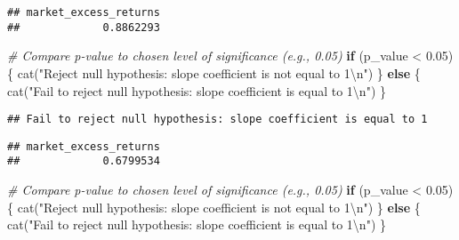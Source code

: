 \documentclass[
]{article}
\newenvironment{Shaded}{\begin{snugshade}}{\end{snugshade}}
\newcommand{\CommentTok}[1]{\textcolor[rgb]{0.56,0.35,0.01}{\textit{#1}}}
\newcommand{\ControlFlowTok}[1]{\textcolor[rgb]{0.13,0.29,0.53}{\textbf{#1}}}
\newcommand{\DecValTok}[1]{\textcolor[rgb]{0.00,0.00,0.81}{#1}}
\newcommand{\FloatTok}[1]{\textcolor[rgb]{0.00,0.00,0.81}{#1}}
\newcommand{\FunctionTok}[1]{\textcolor[rgb]{0.00,0.00,0.00}{#1}}
\newcommand{\NormalTok}[1]{#1}
\newcommand{\OtherTok}[1]{\textcolor[rgb]{0.56,0.35,0.01}{#1}}
\newcommand{\SpecialCharTok}[1]{\textcolor[rgb]{0.00,0.00,0.00}{#1}}
\newcommand{\StringTok}[1]{\textcolor[rgb]{0.31,0.60,0.02}{#1}}
\begin{document}
\begin{verbatim}
## market_excess_returns 
##             0.8862293
\end{verbatim}

\begin{Shaded}
\begin{Highlighting}[]
\CommentTok{\# Compare p{-}value to chosen level of significance (e.g., 0.05)}
\ControlFlowTok{if}\NormalTok{ (p\_value }\SpecialCharTok{\textless{}} \FloatTok{0.05}\NormalTok{) \{}
  \FunctionTok{cat}\NormalTok{(}\StringTok{"Reject null hypothesis: slope coefficient is not equal to 1}\SpecialCharTok{\textbackslash{}n}\StringTok{"}\NormalTok{)}
\NormalTok{\} }\ControlFlowTok{else}\NormalTok{ \{}
  \FunctionTok{cat}\NormalTok{(}\StringTok{"Fail to reject null hypothesis: slope coefficient is equal to 1}\SpecialCharTok{\textbackslash{}n}\StringTok{"}\NormalTok{)}
\NormalTok{\}}
\end{Highlighting}
\end{Shaded}

\begin{verbatim}
## Fail to reject null hypothesis: slope coefficient is equal to 1
\end{verbatim}

\begin{Shaded}
\end{Shaded}

\begin{verbatim}
## market_excess_returns 
##             0.6799534
\end{verbatim}

\begin{Shaded}
\begin{Highlighting}[]
\CommentTok{\# Compare p{-}value to chosen level of significance (e.g., 0.05)}
\ControlFlowTok{if}\NormalTok{ (p\_value }\SpecialCharTok{\textless{}} \FloatTok{0.05}\NormalTok{) \{}
  \FunctionTok{cat}\NormalTok{(}\StringTok{"Reject null hypothesis: slope coefficient is not equal to 1}\SpecialCharTok{\textbackslash{}n}\StringTok{"}\NormalTok{)}
\NormalTok{\} }\ControlFlowTok{else}\NormalTok{ \{}
  \FunctionTok{cat}\NormalTok{(}\StringTok{"Fail to reject null hypothesis: slope coefficient is equal to 1}\SpecialCharTok{\textbackslash{}n}\StringTok{"}\NormalTok{)}
\NormalTok{\}}
\end{Highlighting}
\end{Shaded}
\end{document}

